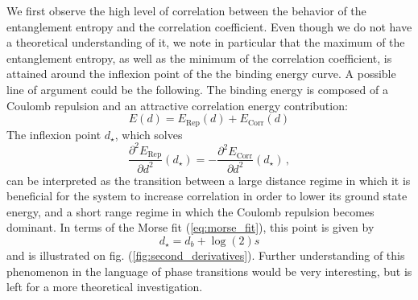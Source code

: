 \documentclass[reprint, amsmath, amssymb, floatfix, aps, pra]{revtex4-2}
\begin{document}
    We first observe the high level of correlation between the behavior of the entanglement entropy and the correlation coefficient. Even though we do not have a theoretical understanding of it, we note in particular that the maximum of the entanglement entropy, as well as the minimum of the correlation coefficient, is attained around the inflexion point of the the binding energy curve. A possible line of argument could be the following. The binding energy is composed of a Coulomb repulsion and an attractive correlation energy contribution:
    \begin{equation}
        E(d)=E_\text{Rep}(d)+E_\text{Corr}(d)
    \end{equation}
    The inflexion point $d_\star$, which solves
    \begin{equation*}
        \frac{\partial^2 E_\text{Rep}}{\partial d^2}(d_\star) = -\frac{\partial^2 E_\text{Corr}}{\partial d^2}(d_\star)\,,
    \end{equation*}
    can be interpreted as the transition between a large distance regime in which it is beneficial for the system to increase correlation in order to lower its ground state energy, and a short range regime in which the Coulomb repulsion becomes dominant. In terms of the Morse fit (\ref{eq:morse_fit}), this point is given by
    \begin{equation*}
        d_\star = d_b + \log(2)s
    \end{equation*}
    and is illustrated on fig. (\ref{fig:second_derivatives}). Further understanding of this phenomenon in the language of phase transitions would be very interesting, but is left for a more theoretical investigation.
\end{document}

